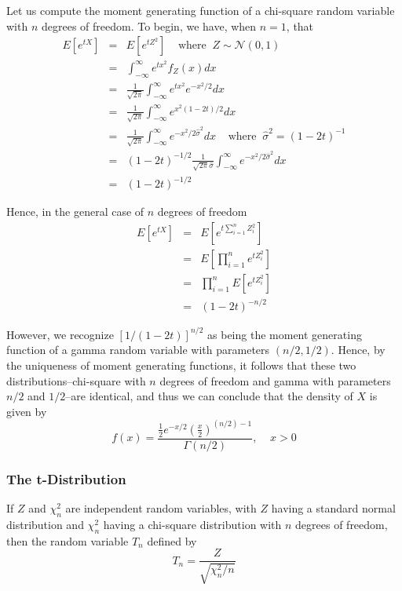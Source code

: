 \documentclass[12pt]{article}
\begin{document}
Let us compute the moment generating function of a chi-square random variable with $n$ degrees of freedom. To begin, we have, when $n=1$, that
\begin{eqnarray*}
  E[e^{tX}]
  &=& E[e^{tZ^2}] \;\;\;\; \text{where} \;\; Z \sim \mathcal{N}(0,1) \\
  &=& \int_{-\infty}^{\infty} e^{tx^2} f_Z(x) dx \\
  &=& \frac{1}{\sqrt{2 \pi}} \int_{-\infty}^{\infty} e^{tx^2} e^{-x^2/2} dx \\
  &=& \frac{1}{\sqrt{2 \pi}} \int_{-\infty}^{\infty} e^{x^2(1-2t)/2} dx \\
  &=& \frac{1}{\sqrt{2 \pi}} \int_{-\infty}^{\infty} e^{-x^2/2\hat{\sigma}^2} dx
  \;\;\;\; \text{where} \;\; \hat{\sigma}^2 = (1-2t)^{-1} \\
  &=& (1-2t)^{-1/2} \frac{1}{\sqrt{2\pi} \hat{\sigma}}
  \int_{-\infty}^{\infty} e^{-x^2/2\hat{\sigma}^2} dx \\
  &=& (1-2t)^{-1/2}
\end{eqnarray*}

Hence, in the general case of $n$ degrees of freedom
\begin{eqnarray*}
  E[e^{tX}]
  &=& E \left[ e^{t \sum_{i=1}^n Z_i^2}  \right] \\
  &=& E \left[ \prod_{i=1}^n e^{tZ_i^2} \right] \\
  &=& \prod_{i=1}^n E \left[ e^{tZ_i^2} \right] \\
  &=& (1-2t)^{-n/2}
\end{eqnarray*}

However, we recognize $[1/(1-2t)]^{n/2}$ as being the moment generating function of a gamma random variable with parameters $(n/2, 1/2)$. Hence, by the uniqueness of moment generating functions, it follows that these two distributions--chi-square with $n$ degrees of freedom and gamma with parameters $n/2$ and $1/2$--are identical, and thus we can conclude that the density of $X$ is given by
\begin{equation*}
  f(x) = \frac{\frac{1}{2} e^{-x/2} \left( \frac{x}{2} \right)^{(n/2)-1} }
  {\Gamma \left( n/2 \right)}, \;\;\;\; x > 0
\end{equation*}

\subsubsection{The t-Distribution}

If $Z$ and $\chi_n^2$ are independent random variables, with $Z$ having a standard normal distribution and $\chi_n^2$ having a chi-square distribution with $n$ degrees of freedom, then the random variable $T_n$ defined by
\begin{equation*}
  T_n = \frac{Z}{\sqrt{\chi_n^2/n}}
\end{equation*}
\end{document}
